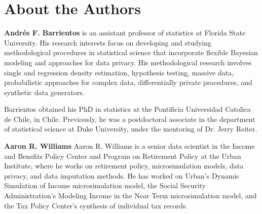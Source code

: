 \fancyfoot{}



\part{About the Authors}

\textbf{Andr\'es F. Barrientos} is an assistant professor of statistics at Florida State University. His research interests focus on developing and studying methodological procedures in statistical science that incorporate flexible Bayesian modeling and approaches for data privacy. His methodological research involves single and regression density estimation, hypothesis testing, massive data, probabilistic approaches for complex data, differentially private procedures, and synthetic data generators.

Barrientos obtained his PhD in statistics at the Pontificia Universidad Catolica de Chile, in Chile. Previously, he was a postdoctoral associate in the department of statistical science at Duke University, under the mentoring of Dr. Jerry Reiter. 

\noindent\textbf{Aaron R. Williams} Aaron R. Williams is a senior data scientist in the Income and Benefits Policy Center and Program on Retirement Policy at the Urban Institute, where he works on retirement policy, microsimulation models, data privacy, and data imputation methods. He has worked on Urban’s Dynamic Simulation of Income microsimulation model, the Social Security Administration’s Modeling Income in the Near Term microsimulation model, and the Tax Policy Center’s synthesis of individual tax records.

